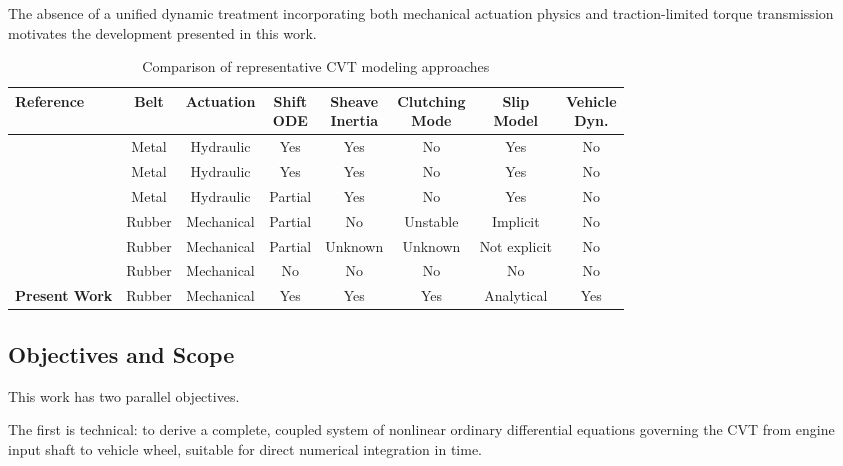 \documentclass[11pt]{article}
\numberwithin{equation}{section}
\begin{document}
The absence of a unified dynamic treatment incorporating both
mechanical actuation physics and traction-limited torque transmission
motivates the development presented in this work.

\begin{table}[h]
\centering
\footnotesize

\begin{tabular}{lccccccc}
\toprule
Reference &
Belt &
Actuation &
\makecell{Shift\\ODE} &
\makecell{Sheave\\Inertia} &
\makecell{Clutching\\Mode} &
\makecell{Slip\\Model} &
\makecell{Vehicle\\Dyn.} \\
\midrule
\cite{Carbone2005} & Metal & Hydraulic & Yes & Yes & No & Yes & No \\
\cite{SrivastavaHaque2006} & Metal & Hydraulic & Yes & Yes & No & Yes & No \\
\cite{Bonsen2004} & Metal & Hydraulic & Partial & Yes & No & Yes & No \\
\cite{JulioPlante2011} & Rubber & Mechanical & Partial & No & Unstable & Implicit & No \\
\cite{SAE2011} & Rubber & Mechanical & Partial & Unknown & Unknown & Not explicit & No \\
\cite{Skinner2020} & Rubber & Mechanical & No & No & No & No & No \\
\textbf{Present Work} & Rubber & Mechanical & Yes & Yes & Yes & Analytical & Yes \\
\bottomrule
\end{tabular}

\caption{Comparison of representative CVT modeling approaches}
\label{tab:lit_comparison}

\end{table}

\subsection{Objectives and Scope}
\label{sec:intro_objectives}

This work has two parallel objectives.

The first is technical: to derive a complete, coupled system of nonlinear
ordinary differential equations governing the CVT from engine input shaft
to vehicle wheel, suitable for direct numerical integration in time.
\end{document}
